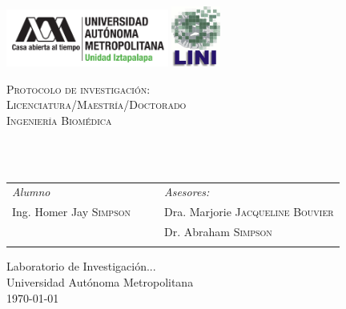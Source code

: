 
\begin{titlepage}

\begin{minipage}{\textwidth}
  \vspace{-3cm}
  \hspace{-2em}
     \includegraphics[width=0.4\textwidth ]{../images/uam-izt-v6}
  \hspace{19em}
     \includegraphics[width=0.12\textwidth]{../images/lini-v1}
\end{minipage}

\begin{center}
	\vspace{0.1cm}

	\begin{minipage}{0.9\textwidth}
		\centering
		\textsc{Protocolo de investigación: \\ Licenciatura/Maestría/Doctorado \\Ingeniería Biomédica}
		\vspace{1em}
   \end{minipage}

   \begin{minipage}{.8\textwidth}
      \centering
		\HRule \\[0.3cm]
		\\
		\HRule
   \end{minipage}
		
	\vspace{1em}
	\begin{tabular}{lp{.2cm}ll}
		\textit{Alumno}
		  & 
		  & 
		  & \textit{Asesores:}\\
		Ing. Homer Jay \textsc{Simpson} 
		  &
		  &
		  & Dra. Marjorie \textsc{Jacqueline Bouvier}\\
		&
		  &
		  & Dr. Abraham \textsc{Simpson}\\[2em]
		&
		&
		& \\
	\end{tabular}


	\vfill
	\begin{flushright}
	Laboratorio de Investigación...\\
	Universidad Autónoma Metropolitana\\
		\normalsize\today
	\end{flushright}

\end{center}

\end{titlepage}

